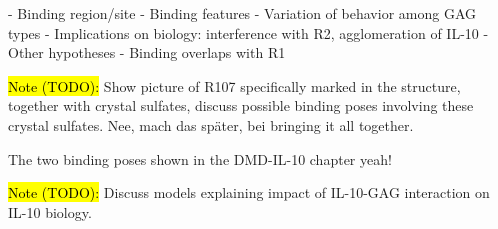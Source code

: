     - Binding region/site
    - Binding features
    - Variation of behavior among GAG types
    - Implications on biology: interference with R2, agglomeration of IL-10
    - Other hypotheses
        - Binding overlaps with R1


\hl{Note (TODO):}
Show picture of R107 specifically marked in the structure, together with
crystal sulfates, discuss possible binding poses involving these crystal
sulfates. Nee, mach das später, bei bringing it all together.

The two binding poses shown in the DMD-IL-10 chapter yeah!


\hl{Note (TODO):}
Discuss models explaining impact of IL-10-GAG interaction on IL-10 biology.



